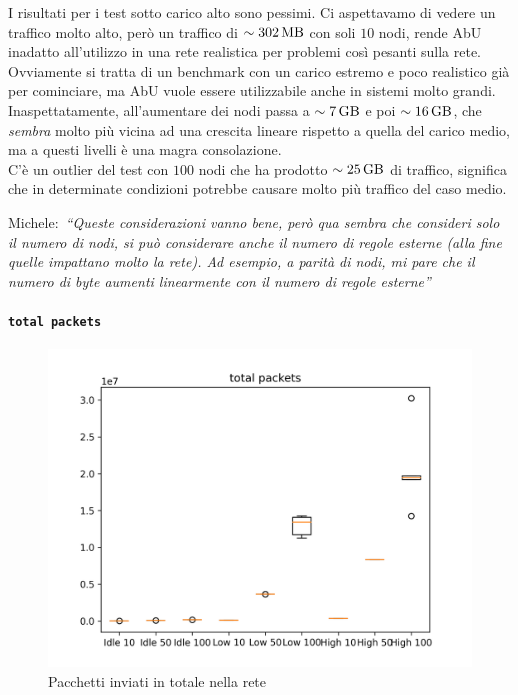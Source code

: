 \documentclass[12pt, a4paper]{article}
\newcommand{\michele}[1]{{\color{red}Michele:~}{\itshape``{#1}''}}
\begin{document}
I risultati per i test sotto carico alto sono pessimi. Ci aspettavamo di vedere un traffico molto alto, però un traffico di $\sim\qty{302}{\mega\byte}$ con soli $10$ nodi, rende AbU inadatto all'utilizzo in una rete realistica per problemi così pesanti sulla rete.
Ovviamente si tratta di un benchmark con un carico estremo e poco realistico già per cominciare, ma AbU vuole essere utilizzabile anche in sistemi molto grandi.\\
Inaspettatamente, all'aumentare dei nodi passa a $\sim\qty{7}{\giga\byte}$ e poi $\sim\qty{16}{\giga\byte}$, che \emph{sembra} molto più vicina ad una crescita lineare rispetto a quella del carico medio, ma a questi livelli è una magra consolazione.\\
C'è un outlier del test con $100$ nodi che ha prodotto $\sim\qty{25}{\giga\byte}$ di traffico, significa che in determinate condizioni potrebbe causare molto più traffico del caso medio.

\michele{Queste considerazioni vanno bene, però qua sembra che consideri solo il numero di nodi, si può considerare anche il numero di regole esterne (alla fine quelle impattano molto la rete). Ad esempio, a parità di nodi, mi pare che il numero di byte aumenti linearmente con il numero di regole esterne}

\paragraph{\lstinline{total packets}}

\begin{figure}[H]
    \includegraphics[width=\linewidth, keepaspectratio]{graphs/total packets.png}
    \caption{Pacchetti inviati in totale nella rete}
    \label{fig:tp}
\end{figure}
\end{document}
